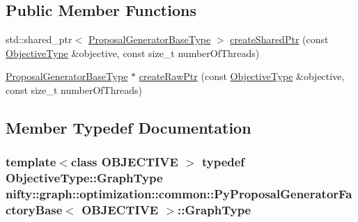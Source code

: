 \subsection*{Public Member Functions}
\begin{DoxyCompactItemize}
\item 
std\+::shared\+\_\+ptr$<$ \hyperlink{classnifty_1_1graph_1_1optimization_1_1common_1_1ProposalGeneratorFactoryBase_ac2be47e9c7b7a249b3d597831c50405d}{Proposal\+Generator\+Base\+Type} $>$ \hyperlink{classnifty_1_1graph_1_1optimization_1_1common_1_1PyProposalGeneratorFactoryBase_a7a63d91299707117bd6c1d8d69fbafeb}{create\+Shared\+Ptr} (const \hyperlink{classnifty_1_1graph_1_1optimization_1_1common_1_1ProposalGeneratorFactoryBase_aa5736d89b93a428099cc2f867266c8c7}{Objective\+Type} \&objective, const size\+\_\+t number\+Of\+Threads)
\item 
\hyperlink{classnifty_1_1graph_1_1optimization_1_1common_1_1ProposalGeneratorFactoryBase_ac2be47e9c7b7a249b3d597831c50405d}{Proposal\+Generator\+Base\+Type} $\ast$ \hyperlink{classnifty_1_1graph_1_1optimization_1_1common_1_1PyProposalGeneratorFactoryBase_a27ab77c0a8fe9016988baf3ddfc60763}{create\+Raw\+Ptr} (const \hyperlink{classnifty_1_1graph_1_1optimization_1_1common_1_1ProposalGeneratorFactoryBase_aa5736d89b93a428099cc2f867266c8c7}{Objective\+Type} \&objective, const size\+\_\+t number\+Of\+Threads)
\end{DoxyCompactItemize}


\subsection{Member Typedef Documentation}
\hypertarget{classnifty_1_1graph_1_1optimization_1_1common_1_1PyProposalGeneratorFactoryBase_a68150bf24a62de0fb75d6360841d8a1b}{}
\subsubsection[{Graph\+Type}]{\setlength{\rightskip}{0pt plus 5cm}template$<$class O\+B\+J\+E\+C\+T\+I\+V\+E $>$ typedef Objective\+Type\+::\+Graph\+Type {\bf nifty\+::graph\+::optimization\+::common\+::\+Py\+Proposal\+Generator\+Factory\+Base}$<$ O\+B\+J\+E\+C\+T\+I\+V\+E $>$\+::{\bf Graph\+Type}}\label{classnifty_1_1graph_1_1optimization_1_1common_1_1PyProposalGeneratorFactoryBase_a68150bf24a62de0fb75d6360841d8a1b}
\hypertarget{classnifty_1_1graph_1_1optimization_1_1common_1_1PyProposalGeneratorFactoryBase_a9449da0812d19e05891bdf7ec4fd58d4}{}
